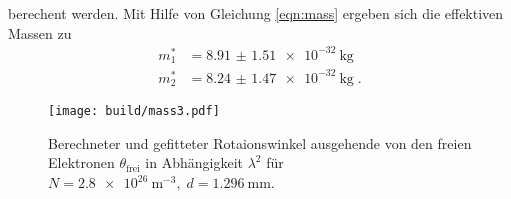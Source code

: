berechent werden.
Mit Hilfe von Gleichung \eqref{eqn:mass} ergeben sich die effektiven Massen zu
\begin{align*}
    m^*_1&= \qty{8.91(151)e-32}{\kilo\gram} \\
    m^*_2&= \qty{8.24(147)e-32}{\kilo\gram} \; \text{.}
\end{align*} 
\begin{figure}
    \centering
    \texttt{[image: build/mass3.pdf]}
    \caption{Berechneter und gefitteter Rotaionswinkel ausgehende von den freien Elektronen $\theta_\text{frei}$ in Abhängigkeit $\lambda^2$ für $
    N=\qty{2.8e26}{\meter\tothe{-3}}, \; d = \qty{1,296}{\milli\meter}$.}
    \label{fig:mass3}
\end{figure}